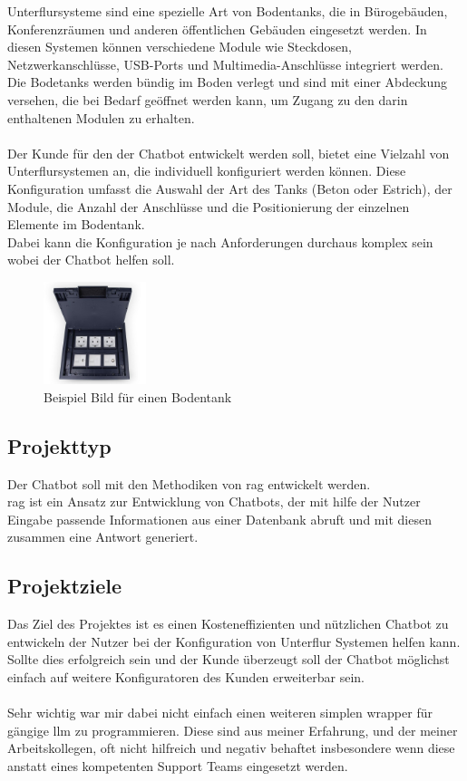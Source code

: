 Unterflursysteme sind eine spezielle Art von Bodentanks, die in Bürogebäuden, Konferenzräumen und anderen öffentlichen Gebäuden eingesetzt werden.
In diesen Systemen können verschiedene Module wie Steckdosen, Netzwerkanschlüsse, USB-Ports und Multimedia-Anschlüsse integriert werden.\\
Die Bodetanks werden bündig im Boden verlegt und sind mit einer Abdeckung versehen, die bei Bedarf geöffnet werden kann, um Zugang zu den darin enthaltenen Modulen zu erhalten.\\\\
Der Kunde für den der Chatbot entwickelt werden soll, bietet eine Vielzahl von Unterflursystemen an, die individuell konfiguriert werden können.
Diese Konfiguration umfasst die Auswahl der Art des Tanks (Beton oder Estrich), der Module, die Anzahl der Anschlüsse und die Positionierung der einzelnen Elemente im Bodentank.\\
Dabei kann die Konfiguration je nach Anforderungen durchaus komplex sein wobei der Chatbot helfen soll.

\begin{figure}[H]
    \begin{center}
        \includegraphics[width=3cm]{bilder/bodentank.jpeg}
        \caption{Beispiel Bild für einen Bodentank}\label{fig:bodentank}
    \end{center}
\end{figure}

\pagebreak
\subsection{Projekttyp}\label{sec:proj_typ}
Der Chatbot soll mit den Methodiken von \gls{rag} entwickelt werden.\\
\gls{rag} ist ein Ansatz zur Entwicklung von Chatbots, der mit hilfe der Nutzer Eingabe
passende Informationen aus einer Datenbank abruft und mit diesen zusammen eine Antwort generiert.

\subsection{Projektziele}\label{sec:proj_ziele}
Das Ziel des Projektes ist es einen Kosteneffizienten und nützlichen Chatbot zu entwickeln der Nutzer
bei der Konfiguration von Unterflur Systemen helfen kann.\\
Sollte dies erfolgreich sein und der Kunde überzeugt soll der Chatbot
möglichst einfach auf weitere Konfiguratoren des Kunden erweiterbar sein.\\\\
Sehr wichtig war mir dabei nicht einfach einen weiteren simplen wrapper für gängige \gls{llm} zu programmieren.
Diese sind aus meiner Erfahrung, und der meiner Arbeitskollegen, oft nicht hilfreich und negativ behaftet insbesondere wenn diese
anstatt eines kompetenten Support Teams eingesetzt werden.

